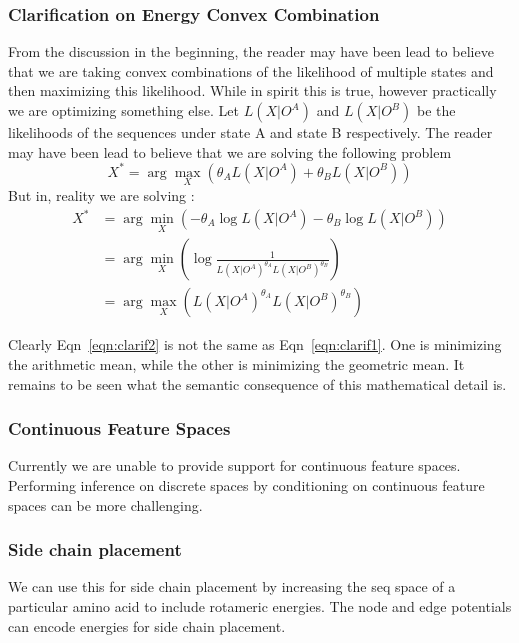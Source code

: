 \documentclass{article}
\begin{document}
\subsubsection{Clarification on Energy Convex Combination}
From the discussion in the beginning, the reader may have been lead to believe that we are taking convex combinations of the likelihood of multiple states and then maximizing this likelihood. While in spirit this is true, however practically we are optimizing something else. Let $L(X|O^A)$  and $L(X|O^B)$ be the likelihoods of the sequences under state A and state B respectively. The reader may have been lead to believe that we are solving the following problem
\begin{equation}
\label{eqn:clarif1}
X^* = \arg \max_X \left( \theta_A L(X|O^A) + \theta_B L(X|O^B) \right)
\end{equation}
But in, reality we are solving : 
\begin{align}
X^* &= \arg \min_X \left( -\theta_A \log L(X|O^A) - \theta_B \log L(X|O^B) \right) \\
&= \arg \min_X \left( \log \frac{1}{L(X|O^A)^{\theta_A} L(X|O^B)^{\theta_B}} \right) \\
&= \arg \max_X \left( L(X|O^A)^{\theta_A} L(X|O^B)^{\theta_B} \right)
\label{eqn:clarif2} 
\end{align}

Clearly Eqn~\ref{eqn:clarif2} is not the same as Eqn~\ref{eqn:clarif1}. One is minimizing the arithmetic mean, while the other is minimizing the geometric mean. It remains to be seen what the semantic consequence of this mathematical detail is. 


\subsubsection{Continuous Feature Spaces}
Currently we are unable to provide support for continuous feature spaces.  Performing inference on discrete spaces by conditioning on continuous feature spaces can be more challenging.

\subsubsection{Side chain placement}
We can use this for side chain placement by increasing the seq space of a particular amino acid to include rotameric energies. The node and edge potentials can encode energies for side chain placement.
\end{document}
